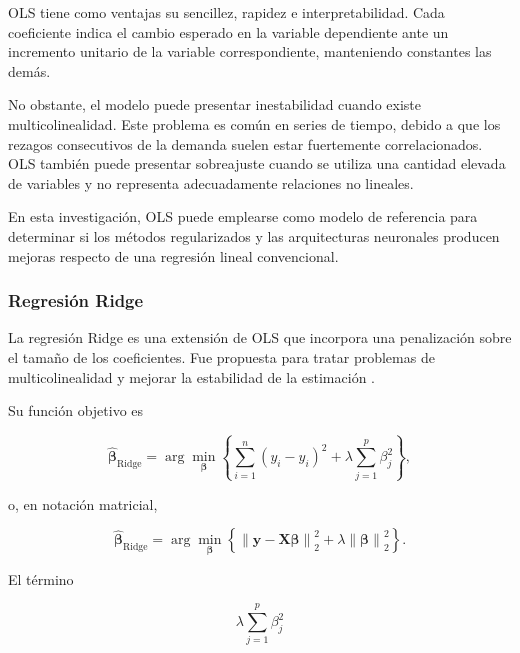 OLS tiene como ventajas su sencillez, rapidez e interpretabilidad. Cada coeficiente indica el cambio esperado en la variable dependiente ante un incremento unitario de la variable correspondiente, manteniendo constantes las demás.

No obstante, el modelo puede presentar inestabilidad cuando existe multicolinealidad. Este problema es común en series de tiempo, debido a que los rezagos consecutivos de la demanda suelen estar fuertemente correlacionados. OLS también puede presentar sobreajuste cuando se utiliza una cantidad elevada de variables y no representa adecuadamente relaciones no lineales.

En esta investigación, OLS puede emplearse como modelo de referencia para determinar si los métodos regularizados y las arquitecturas neuronales producen mejoras respecto de una regresión lineal convencional.

\subsubsection{Regresión Ridge}
\label{sec:ridge}

La regresión Ridge es una extensión de OLS que incorpora una penalización sobre el tamaño de los coeficientes. Fue propuesta para tratar problemas de multicolinealidad y mejorar la estabilidad de la estimación \cite{hoerl1970ridge}.

Su función objetivo es

\begin{equation}
    \hat{\boldsymbol{\beta}}_{\mathrm{Ridge}}
    =
    \arg\min_{\boldsymbol{\beta}}
    \left\{
        \sum_{i=1}^{n}
        \left(
            y_i-\hat{y}_i
        \right)^2
        +
        \lambda
        \sum_{j=1}^{p}\beta_j^2
    \right\},
\end{equation}

o, en notación matricial,

\begin{equation}
    \hat{\boldsymbol{\beta}}_{\mathrm{Ridge}}
    =
    \arg\min_{\boldsymbol{\beta}}
    \left\{
        \left\|
            \mathbf{y}-\mathbf{X}\boldsymbol{\beta}
        \right\|_2^2
        +
        \lambda
        \left\|
            \boldsymbol{\beta}
        \right\|_2^2
    \right\}.
\end{equation}

El término

\begin{equation}
    \lambda\sum_{j=1}^{p}\beta_j^2
\end{equation}

